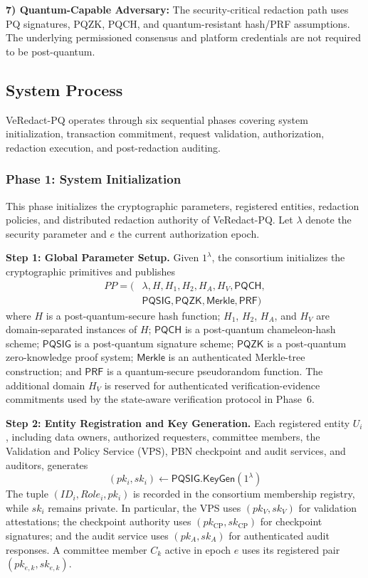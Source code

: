 \documentclass[lettersize,journal]{IEEEtran}
\begin{document}
\textbf{7) Quantum-Capable Adversary:}
The security-critical redaction path uses PQ signatures, PQZK, PQCH,
and quantum-resistant hash/PRF assumptions. The underlying permissioned
consensus and platform credentials are not required to be
post-quantum.  \subsection{System Process}

VeRedact-PQ operates through six sequential phases covering system
initialization, transaction commitment, request validation, authorization,
redaction execution, and post-redaction auditing.

    
    \subsubsection*{\textbf{Phase 1: System Initialization}}

This phase initializes the cryptographic parameters, registered
entities, redaction policies, and distributed redaction authority of
VeRedact-PQ. Let $\lambda$ denote the security parameter and $e$ the
current authorization epoch.

\textbf{Step 1: Global Parameter Setup.}
Given $1^\lambda$, the consortium initializes the cryptographic
primitives and publishes
\begin{equation}
\begin{aligned}
PP=(&\lambda,H,H_1,H_2,H_A,H_V,\mathsf{PQCH},\\
&\mathsf{PQSIG},\mathsf{PQZK},\mathsf{Merkle},\mathsf{PRF})
\end{aligned}
\end{equation}
where $H$ is a post-quantum-secure hash function;
$H_1$, $H_2$, $H_A$, and $H_V$ are domain-separated instances of
$H$; $\mathsf{PQCH}$ is a post-quantum chameleon-hash scheme;
$\mathsf{PQSIG}$ is a post-quantum signature scheme;
$\mathsf{PQZK}$ is a post-quantum zero-knowledge proof system;
$\mathsf{Merkle}$ is an authenticated Merkle-tree construction; and
$\mathsf{PRF}$ is a quantum-secure pseudorandom function.
The additional domain $H_V$ is reserved for authenticated
verification-evidence commitments used by the state-aware verification
protocol in Phase~6.

\textbf{Step 2: Entity Registration and Key Generation.}
Each registered entity $U_i$, including data owners, authorized
requesters, committee members, the Validation and Policy Service
(VPS), PBN checkpoint and audit services, and auditors, generates
\begin{equation}
(pk_i,sk_i)\leftarrow
\mathsf{PQSIG.KeyGen}(1^\lambda)
\end{equation}
The tuple $(ID_i,Role_i,pk_i)$ is recorded in the consortium membership
registry, while $sk_i$ remains private. In particular, the VPS uses
$(pk_V,sk_V)$ for validation attestations; the checkpoint authority uses
$(pk_{\mathrm{CP}},sk_{\mathrm{CP}})$ for checkpoint signatures; and the
audit service uses $(pk_A,sk_A)$ for authenticated audit responses.
A committee member $C_k$ active in epoch $e$ uses its registered pair
$(pk_{e,k},sk_{e,k})$.
\end{document}
